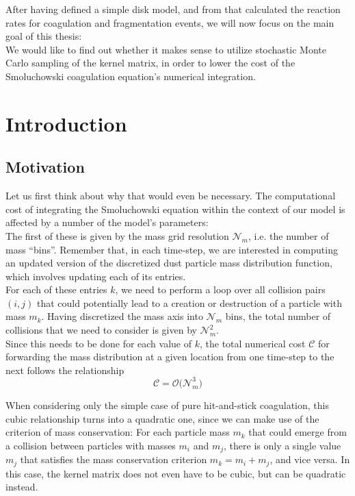 After having defined a simple disk model, and from that calculated the reaction rates for 
coagulation and fragmentation events, we will now focus on the main goal of this thesis: \\

We would like to find out whether it makes sense to utilize stochastic Monte Carlo sampling of the 
kernel matrix, in order to lower the cost of the Smoluchowski coagulation equation's numerical 
integration.

\section{Introduction}

\subsection{Motivation}

    Let us first think about why that would even be necessary.
    The computational cost of integrating the Smoluchowski equation within the context of our 
    model is affected by a number of the model's parameters: \\

    The first of these is given by the mass grid resolution $\mathcal N_m$, i.e. the number of 
    mass ``bins''. Remember that, in each time-step, we are interested in computing an updated 
    version of the discretized dust particle mass distribution function, which involves 
    updating each of its entries. \\

    For each of these entries $k$, we need to perform a loop over all collision pairs $(i, j)$ that 
    could potentially lead to a creation or destruction of a particle with mass $m_k$. 
    Having discretized the mass axis into $\mathcal N_m$ bins, the total number of collisions that
    we need to consider is given by $\mathcal N_m^2$. \\

    Since this needs to be done for each value of $k$, the total numerical cost $\mathcal C$ for 
    forwarding the mass distribution at a given location from one time-step to the next follows the 
    relationship
    \begin{equation}
        \mathcal C = \mathcal O\big( \mathcal N_m^3 \big)
    \end{equation}

    When considering only the simple case of pure hit-and-stick coagulation, this cubic 
    relationship turns into a quadratic one, since we can make use of the criterion of mass 
    conservation: For each particle mass $m_k$ that could emerge from a collision between 
    particles with masses $m_i$ and $m_j$, there is only a single value $m_j$ that satisfies the 
    mass conservation criterion $m_k = m_i + m_j$, and vice versa. In this case, the kernel matrix 
    does not even have to be cubic, but can be quadratic instead. \\

